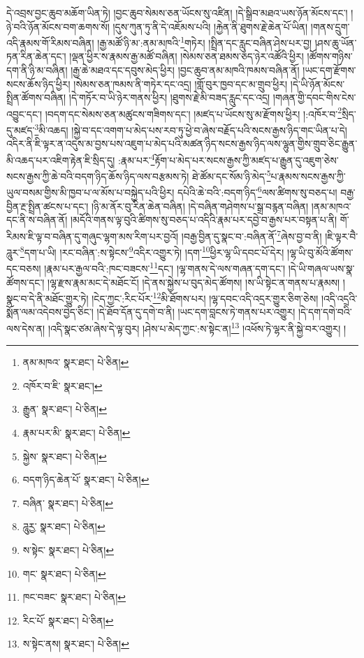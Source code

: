 དེ་འབྲས་བྱང་ཆུབ་མཆོག་ཡིན་ཏེ། །བྱང་ཆུབ་སེམས་ཅན་ཡོངས་སུ་འཛིན། །དེ་སྒྲིབ་མཐའ་ཡས་ཉོན་མོངས་དང་། །ཉེ་བའི་ཉོན་མོངས་བག་ཆགས་སོ། །དུས་ཀུན་ཏུ་ནི་དེ་འཇོམས་པའི། །རྐྱེན་ནི་ཐུགས་རྗེ་ཆེན་པོ་ཡིན། །གནས་དྲུག་འདི་རྣམས་གོ་རིམས་བཞིན། །རྒྱ་མཚོ་ཉི་མ་:ནམ་མཁའི་\footnote{ནམ་མཁའ་  སྣར་ཐང་།  པེ་ཅིན། }གཏེར། །སྤྲིན་དང་རླུང་བཞིན་ཤེས་པར་བྱ། །ཤས་ཆུ་ཡོན་ཏན་རིན་ཆེན་དང་། །ལྡན་ཕྱིར་ས་རྣམས་རྒྱ་མཚོ་བཞིན། །སེམས་ཅན་ཐམས་ཅད་ཉེར་འཚོའི་ཕྱིར། །ཚོགས་གཉིས་དག་ནི་ཉི་མ་བཞིན། །རྒྱ་ཆེ་མཐའ་དང་དབུས་མེད་ཕྱིར། །བྱང་ཆུབ་ནམ་མཁའི་ཁམས་བཞིན་ནོ། །ཡང་དག་རྫོགས་སངས་ཆོས་ཉིད་ཕྱིར། །སེམས་ཅན་ཁམས་ནི་གཏེར་དང་འདྲ། །གློ་བུར་ཁྱབ་དང་མ་གྲུབ་ཕྱིར། །དེ་ཡི་ཉོན་མོངས་སྤྲིན་ཚོགས་བཞིན། །དེ་གཏོར་བ་ཡི་ཉེར་གནས་ཕྱིར། །ཐུགས་རྗེ་མི་བཟད་རླུང་དང་འདྲ། །གཞན་གྱི་དབང་གིས་ངེས་འབྱུང་དང་། །བདག་དང་སེམས་ཅན་མཚུངས་གཟིགས་དང་། །མཛད་པ་ཡོངས་སུ་མ་རྫོགས་ཕྱིར། །:འཁོར་བ་\footnote{འཁོར་བ་ཇི་  སྣར་ཐང་། }སྲིད་དུ་མཛད་\footnote{རྒྱུན་  སྣར་ཐང་།  པེ་ཅིན། }མི་འཆད། །སྐྱེ་བ་དང་འགག་པ་མེད་པས་རབ་ཏུ་ཕྱེ་བ་ཞེས་བརྗོད་པའི་སངས་རྒྱས་ཉིད་གང་ཡིན་པ་དེ། འདིར་ནི་ཇི་ལྟར་ན་འདུས་མ་བྱས་པས་འཇུག་པ་མེད་པའི་མཚན་ཉིད་སངས་རྒྱས་ཉིད་ལས་ལྷུན་གྱིས་གྲུབ་ཅིང་རྒྱུན་མི་འཆད་པར་འཇིག་རྟེན་ཇི་སྲིད་དུ། :རྣམ་པར་\footnote{རྣམ་པར་མི་  སྣར་ཐང་།  པེ་ཅིན། }རྟོག་པ་མེད་པར་སངས་རྒྱས་ཀྱི་མཛད་པ་རྒྱུན་དུ་འཇུག་ཅེས་སངས་རྒྱས་ཀྱི་ཆེ་བའི་བདག་ཉིད་ཆོས་ཉིད་ལས་བརྩམས་ཏེ། ཐེ་ཚོམ་དང་སོམ་ཉི་མེད་\footnote{སྐྱེས་  སྣར་ཐང་།  པེ་ཅིན། }པ་རྣམས་སངས་རྒྱས་ཀྱི་ཡུལ་བསམ་གྱིས་མི་ཁྱབ་པ་ལ་མོས་པ་བསྐྱེད་པའི་ཕྱིར། དཔེའི་ཆེ་བའི་:བདག་ཉིད་\footnote{བདག་ཉིད་ཆེན་པོ་  སྣར་ཐང་།  པེ་ཅིན། }ལས་ཚིགས་སུ་བཅད་པ། བརྒྱ་བྱིན་རྔ་སྤྲིན་ཚངས་པ་དང་། །ཉི་མ་ནོར་བུ་རིན་ཆེན་བཞིན། །དེ་བཞིན་གཤེགས་པ་སྒྲ་བརྙན་བཞིན། །ནམ་མཁའ་དང་ནི་ས་བཞིན་ནོ། །མདོའི་གནས་ལྟ་བུའི་ཚིགས་སུ་བཅད་པ་འདིའི་རྣམ་པར་དབྱེ་བ་རྒྱས་པར་བསྟན་པ་ནི། གོ་རིམས་ཇི་ལྟ་བ་བཞིན་དུ་གཞུང་ལྷག་མས་རིག་པར་བྱའོ། །བརྒྱ་བྱིན་དུ་སྣང་བ་:བཞིན་ནོ་\footnote{བཞིན་  སྣར་ཐང་།  པེ་ཅིན། }ཞེས་བྱ་བ་ནི། །ཇི་ལྟར་བཻ་ཌཱུར་\footnote{ཌཱུརྱ་  སྣར་ཐང་།  པེ་ཅིན། }དག་པ་ཡི། །རང་བཞིན་:ས་སྟེངས་\footnote{ས་སྟེང་  སྣར་ཐང་།  པེ་ཅིན། }འདིར་འགྱུར་ཏེ། །དག་\footnote{གང་  སྣར་ཐང་།  པེ་ཅིན། }ཕྱིར་ལྷ་ཡི་དབང་པོ་དེར། །ལྷ་ཡི་བུ་མོའི་ཚོགས་དང་བཅས། །རྣམ་པར་རྒྱལ་བའི་:ཁང་བཟངས་\footnote{ཁང་བཟང་  སྣར་ཐང་།  པེ་ཅིན། }དང་། །ལྷ་གནས་དེ་ལས་གཞན་དག་དང་། །དེ་ཡི་གཞལ་ཡས་སྣ་ཚོགས་དང་། །ལྷ་རྫས་རྣམ་མང་དེ་མཐོང་ངོ། །དེ་ནས་སྐྱེས་པ་བུད་མེད་ཚོགས། །ས་ཡི་སྟེང་ན་གནས་པ་རྣམས། །སྣང་བ་དེ་ནི་མཐོང་གྱུར་ཏེ། །ངེད་ཀྱང་:རིང་པོར་\footnote{རིང་པོ་  སྣར་ཐང་།  པེ་ཅིན། }མི་ཐོགས་པར། །ལྷ་དབང་འདི་འདྲར་གྱུར་ཅིག་ཅེས། །འདི་འདྲའི་སྨོན་ལམ་འདེབས་བྱེད་ཅིང་། །དེ་ཐོབ་དོན་དུ་དགེ་བ་ནི། །ཡང་དག་བླངས་ཏེ་གནས་པར་འགྱུར། །དེ་དག་དགེ་བའི་ལས་དེས་ན། །འདི་སྣང་ཙམ་ཞེས་དེ་ལྟ་བུར། །ཤེས་པ་མེད་ཀྱང་:ས་སྟེང་ན།\footnote{ས་སྟེང་ནས།  སྣར་ཐང་།  པེ་ཅིན། } །འཕོས་ཏེ་ལྷར་ནི་སྐྱེ་བར་འགྱུར། །
